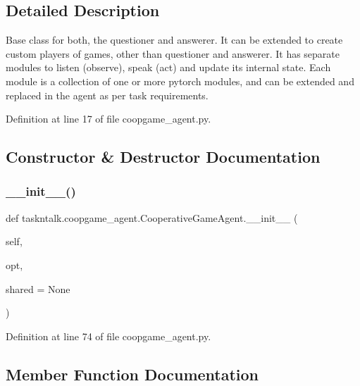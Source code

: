\subsection{Detailed Description}
\begin{DoxyVerb}Base class for both, the questioner and answerer. It can be extended to
create custom players of games, other than questioner and answerer. It has
separate modules to listen (observe), speak (act) and update its internal
state. Each module is a collection of one or more pytorch modules, and can
be extended and replaced in the agent as per task requirements.
\end{DoxyVerb}
 

Definition at line 17 of file coopgame\+\_\+agent.\+py.



\subsection{Constructor \& Destructor Documentation}
\mbox{\label{classtaskntalk_1_1coopgame__agent_1_1CooperativeGameAgent_a99e865ac4567a7ba60a63fcf81f987a6}} 
\subsubsection{\texorpdfstring{\+\_\+\+\_\+init\+\_\+\+\_\+()}{\_\_init\_\_()}}
{\footnotesize\ttfamily def taskntalk.\+coopgame\+\_\+agent.\+Cooperative\+Game\+Agent.\+\_\+\+\_\+init\+\_\+\+\_\+ (\begin{DoxyParamCaption}\item[{}]{self,  }\item[{}]{opt,  }\item[{}]{shared = {\ttfamily None} }\end{DoxyParamCaption})}



Definition at line 74 of file coopgame\+\_\+agent.\+py.



\subsection{Member Function Documentation}
\mbox{\label{classtaskntalk_1_1coopgame__agent_1_1CooperativeGameAgent_a55ee36e8823dccdcd456bdbf409bccd5}} 
